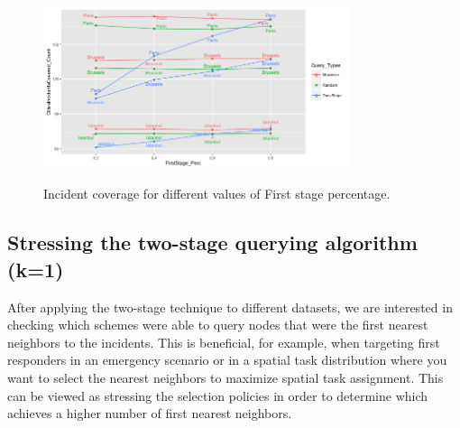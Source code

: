 \documentclass{acm_proc_article-sp}
\begin{document}
\begin{figure}[!h]
\centering
\includegraphics[width=9cm ,height=5.5cm]{figuresPng/citiesInc.png}
\caption{Incident coverage for different values of First stage percentage. }
\label{fig: hollaIncCoverage}
\end{figure}
\subsection{Stressing the two-stage querying algorithm (k=1)}
After applying the two-stage technique to different datasets, we are interested in checking which schemes were able to query nodes that were the first nearest neighbors to the incidents. This is beneficial, for example, when targeting first responders in an emergency scenario or in a spatial task distribution where you want to select the nearest neighbors to maximize spatial task assignment. This can be viewed as stressing the selection policies in order to determine which achieves a higher number of first nearest neighbors.\par
\end{document}
